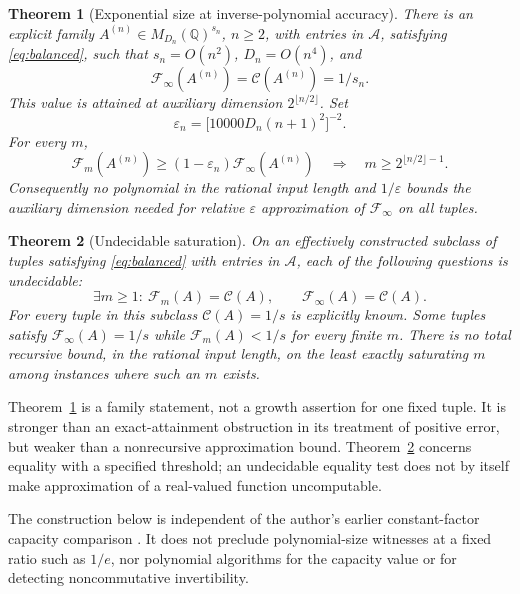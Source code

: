 \documentclass[11pt]{article}
\newtheorem{theorem}{Theorem}
\newcommand{\Q}{\mathbb Q}
\newcommand{\F}{\mathcal F}
\newcommand{\K}{\mathcal C}
\begin{document}
\begin{theorem}[Exponential size at inverse-polynomial accuracy]\label{thm:exponential}
There is an explicit family $A^{(n)}\in M_{D_n}(\Q)^{s_n}$, $n\ge2$, with entries in $\mathcal A$, satisfying \eqref{eq:balanced}, such that $s_n=O(n^2)$, $D_n=O(n^4)$, and
\[
 \F_\infty(A^{(n)})=\K(A^{(n)})=1/s_n.
\]
This value is attained at auxiliary dimension $2^{\lfloor n/2\rfloor}$. Set
\begin{equation}
 \varepsilon_n=\bigl[10000D_n(n+1)^2\bigr]^{-2}. \label{eq:epsilon}
\end{equation}
For every $m$,
\[
 \F_m(A^{(n)})\ge(1-\varepsilon_n)\F_\infty(A^{(n)})
 \quad\Longrightarrow\quad m\ge2^{\lfloor n/2\rfloor-1}.
\]
Consequently no polynomial in the rational input length and $1/\varepsilon$ bounds the auxiliary dimension needed for relative $\varepsilon$ approximation of $\F_\infty$ on all tuples.
\end{theorem}

\begin{theorem}[Undecidable saturation]\label{thm:undecidable}
On an effectively constructed subclass of tuples satisfying \eqref{eq:balanced} with entries in $\mathcal A$, each of the following questions is undecidable:
\[
 \exists m\ge1:\ \F_m(A)=\K(A),\qquad
 \F_\infty(A)=\K(A).
\]
For every tuple in this subclass $\K(A)=1/s$ is explicitly known.
Some tuples satisfy $\F_\infty(A)=1/s$ while $\F_m(A)<1/s$ for every finite $m$. There is no total recursive bound, in the rational input length, on the least exactly saturating $m$ among instances where such an $m$ exists.
\end{theorem}

Theorem~\ref{thm:exponential} is a family statement, not a growth assertion for one fixed tuple. It is stronger than an exact-attainment obstruction in its treatment of positive error, but weaker than a nonrecursive approximation bound. Theorem~\ref{thm:undecidable} concerns equality with a specified threshold; an undecidable equality test does not by itself make approximation of a real-valued function uncomputable.

The construction below is independent of the author's earlier constant-factor capacity comparison \cite{prior}. It does not preclude polynomial-size witnesses at a fixed ratio such as $1/e$, nor polynomial algorithms for the capacity value or for detecting noncommutative invertibility.
\end{document}
